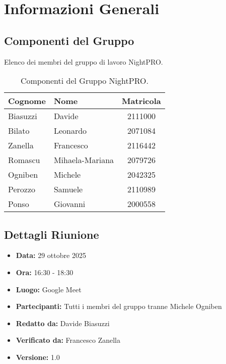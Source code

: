 \documentclass[a4paper, 11pt, oneside]{scrartcl} %
\begin{document}
\section{Informazioni Generali}

\subsection{Componenti del Gruppo}
Elenco dei membri del gruppo di lavoro NightPRO.
\begin{table}[h!]
\centering
\begin{tabular}{@{}llc@{}}
\toprule
\textbf{Cognome} & \textbf{Nome} & \textbf{Matricola} \\
\midrule
Biasuzzi & Davide & 2111000 \\
Bilato & Leonardo & 2071084 \\
Zanella & Francesco & 2116442 \\
Romascu & Mihaela-Mariana & 2079726 \\
Ogniben & Michele & 2042325 \\
Perozzo & Samuele & 2110989 \\
Ponso & Giovanni & 2000558 \\
\bottomrule
\end{tabular}
\caption{Componenti del Gruppo NightPRO.}
\end{table}

\subsection{Dettagli Riunione}
\begin{itemize}
    \item \textbf{Data:} 29 ottobre 2025
    \item \textbf{Ora:} 16:30 - 18:30
    \item \textbf{Luogo:} Google Meet
    \item \textbf{Partecipanti:} Tutti i membri del gruppo tranne Michele Ogniben
    \item \textbf{Redatto da: } Davide Biasuzzi
    \item \textbf{Verificato da:} Francesco Zanella
    \item \textbf{Versione: } 1.0
\end{itemize}


\newpage
\end{document}
